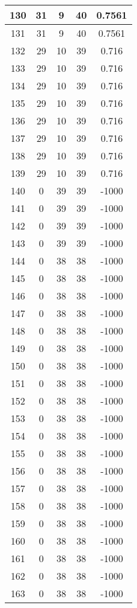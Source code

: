 \documentclass[letterpaper, 12pt]{article}
\begin{document}
\begin{longtable}{|c|c|c|c|c|}
\hline
130 & 31 & 9 & 40 & 0.7561 \\
\hline
131 & 31 & 9 & 40 & 0.7561 \\
\hline
132 & 29 & 10 & 39 & 0.716 \\
\hline
133 & 29 & 10 & 39 & 0.716 \\
\hline
134 & 29 & 10 & 39 & 0.716 \\
\hline
135 & 29 & 10 & 39 & 0.716 \\
\hline
136 & 29 & 10 & 39 & 0.716 \\
\hline
137 & 29 & 10 & 39 & 0.716 \\
\hline
138 & 29 & 10 & 39 & 0.716 \\
\hline
139 & 29 & 10 & 39 & 0.716 \\
\hline
140 & 0 & 39 & 39 & -1000 \\
\hline
141 & 0 & 39 & 39 & -1000 \\
\hline
142 & 0 & 39 & 39 & -1000 \\
\hline
143 & 0 & 39 & 39 & -1000 \\
\hline
144 & 0 & 38 & 38 & -1000 \\
\hline
145 & 0 & 38 & 38 & -1000 \\
\hline
146 & 0 & 38 & 38 & -1000 \\
\hline
147 & 0 & 38 & 38 & -1000 \\
\hline
148 & 0 & 38 & 38 & -1000 \\
\hline
149 & 0 & 38 & 38 & -1000 \\
\hline
150 & 0 & 38 & 38 & -1000 \\
\hline
151 & 0 & 38 & 38 & -1000 \\
\hline
152 & 0 & 38 & 38 & -1000 \\
\hline
153 & 0 & 38 & 38 & -1000 \\
\hline
154 & 0 & 38 & 38 & -1000 \\
\hline
155 & 0 & 38 & 38 & -1000 \\
\hline
156 & 0 & 38 & 38 & -1000 \\
\hline
157 & 0 & 38 & 38 & -1000 \\
\hline
158 & 0 & 38 & 38 & -1000 \\
\hline
159 & 0 & 38 & 38 & -1000 \\
\hline
160 & 0 & 38 & 38 & -1000 \\
\hline
161 & 0 & 38 & 38 & -1000 \\
\hline
162 & 0 & 38 & 38 & -1000 \\
\hline
163 & 0 & 38 & 38 & -1000 \\
\hline

\end{longtable}
\end{document}
